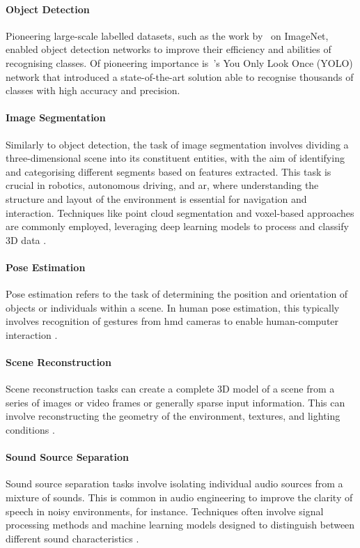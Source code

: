 \paragraph{Object Detection}
Pioneering large-scale labelled datasets, such as the work by~\cite{deng2009imagenet} on ImageNet, enabled object detection networks to improve their efficiency and abilities of recognising classes. Of pioneering importance is~\cite{Redmon_2016_CVPR}'s You Only Look Once (YOLO) network that introduced a state-of-the-art solution able to recognise thousands of classes with high accuracy and precision.\par
\paragraph{Image Segmentation}
Similarly to object detection, the task of image segmentation involves dividing a three-dimensional scene into its constituent entities, with the aim of identifying and categorising different segments based on features extracted. This task is crucial in robotics, autonomous driving, and \acrshort{ar}, where understanding the structure and layout of the environment is essential for navigation and interaction. Techniques like point cloud segmentation and voxel-based approaches are commonly employed, leveraging deep learning models to process and classify 3D data \citep{minae_segmentation, feng2020semantic3d, kalogerakis20173d}.\par
\paragraph{Pose Estimation}
Pose estimation refers to the task of determining the position and orientation of objects or individuals within a scene. In human pose estimation, this typically involves recognition of gestures from \acrshort{hmd} cameras to enable human-computer interaction \citep{andriluka20142d, spittle2022review}.\par
\paragraph{Scene Reconstruction}
Scene reconstruction tasks can create a complete 3D model of a scene from a series of images or video frames or generally sparse input information. This can involve reconstructing the geometry of the environment, textures, and lighting conditions \citep{patow2003survey}.\par
\paragraph{Sound Source Separation}
Sound source separation tasks involve isolating individual audio sources from a mixture of sounds. This is common in audio engineering to improve the clarity of speech in noisy environments, for instance. Techniques often involve signal processing methods and machine learning models designed to distinguish between different sound characteristics \citep{virtanen2006sound}.\par
